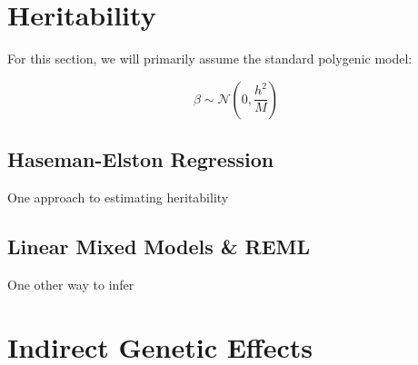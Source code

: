 \documentclass{pset}
\begin{document}
\section{Heritability}

For this section, we will primarily assume the standard polygenic model:

$$\beta \sim \mathcal{N}\left(0, \frac{h^2}{M}\right)$$


\subsection*{Haseman-Elston Regression}
 
One approach to estimating heritability 


\subsection*{Linear Mixed Models \& REML}


One other way to infer 



\section{Indirect Genetic Effects}
\end{document}

